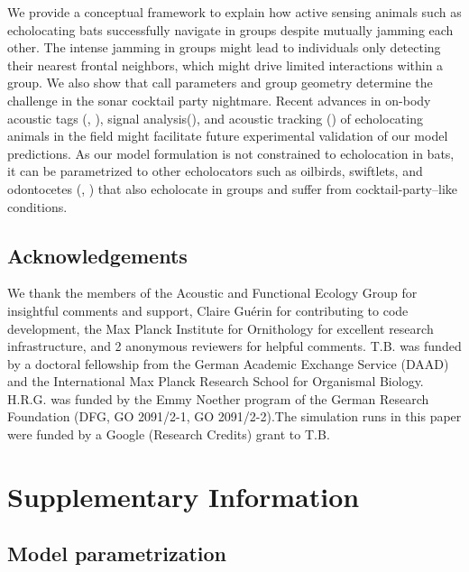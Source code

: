 \documentclass[
]{book}
\begin{document}
We provide a conceptual framework to explain how active sensing animals such as echolocating bats successfully navigate in groups despite mutually jamming each other. The intense jamming in groups might lead to individuals only detecting their nearest frontal neighbors, which might drive limited interactions within a group. We also show that call parameters and group geometry determine the challenge in the sonar cocktail party nightmare. Recent advances in on-body acoustic tags (\citet{cvikel2015b}, \citet{stidsholt2018a}), signal analysis(\citet{aodha2018a}), and acoustic tracking (\citet{seibert2015a}) of echolocating animals in the field might facilitate future experimental validation of our model predictions. As our model formulation is not constrained to echolocation in bats, it can be parametrized to other echolocators such as oilbirds, swiftlets, and odontocetes (\citet{brinkl2013a}, \citet{surlykke2014a}) that also echolocate in groups and suffer from cocktail-party--like conditions.

\hypertarget{acknowledgements}{%
\subsection{Acknowledgements}\label{acknowledgements}}

We thank the members of the Acoustic and Functional Ecology Group for insightful comments and support, Claire Guérin for contributing to code development, the Max Planck Institute for Ornithology for excellent research infrastructure, and 2 anonymous reviewers for helpful comments. T.B. was funded by a doctoral fellowship from the German Academic Exchange Service (DAAD) and the International Max Planck Research School for Organismal Biology. H.R.G. was funded by the Emmy Noether program of the German Research Foundation (DFG, GO 2091/2-1, GO 2091/2-2).The simulation runs in this paper were funded by a Google (Research Credits) grant to T.B.

\newpage

\hypertarget{supplementary-information}{%
\section{Supplementary Information}\label{supplementary-information}}

\newpage

\hypertarget{model-parametrization-1}{%
\subsection{Model parametrization}\label{model-parametrization-1}}
\end{document}
